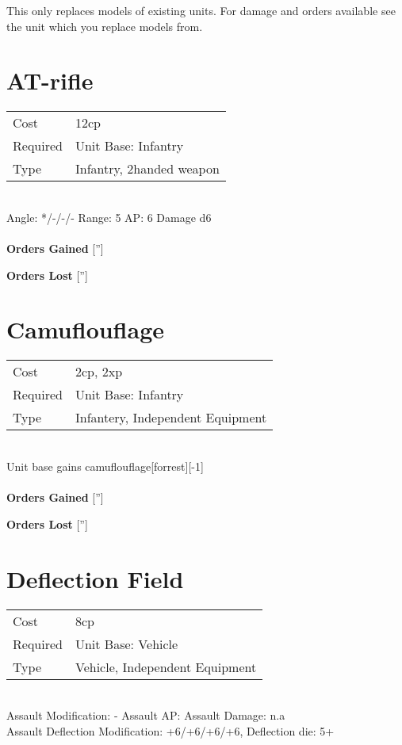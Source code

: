 This only replaces models of existing units. For damage and orders available see the unit which you replace models from.



\pagebreak\section{ AT-rifle }

\begin{tabular}{ll}
    Cost & 12cp \\
    Required & Unit Base: Infantry\\
    Type & Infantry, 2handed weapon\\
\end{tabular}
\ \\
\indent Angle: */-/-/- Range: 5  AP: 6 Damage d6 \\

\ \\

{\bf Orders Gained}
['']

{\bf Orders Lost}
['']
\section{ Camuflouflage }

\begin{tabular}{ll}
    Cost & 2cp, 2xp \\
    Required & Unit Base: Infantry\\
    Type & Infantery, Independent Equipment\\
\end{tabular}
\ \\
Unit base gains camuflouflage[forrest][-1] \\

\ \\

{\bf Orders Gained}
['']

{\bf Orders Lost}
['']
\section{ Deflection Field }

\begin{tabular}{ll}
    Cost & 8cp \\
    Required & Unit Base: Vehicle\\
    Type & Vehicle, Independent Equipment\\
\end{tabular}
\ \\
Assault Modification: - Assault AP:  Assault Damage: n.a\\
Assault Deflection Modification: +6/+6/+6/+6, Deflection die: 5+ \\




